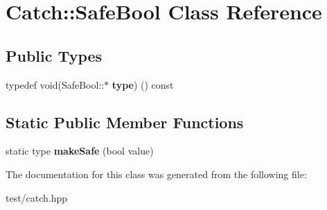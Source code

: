 \hypertarget{classCatch_1_1SafeBool}{}\section{Catch\+:\+:Safe\+Bool Class Reference}
\label{classCatch_1_1SafeBool}
\subsection*{Public Types}
\begin{DoxyCompactItemize}
\item 
typedef void(Safe\+Bool\+::$\ast$ {\bfseries type}) () const \hypertarget{classCatch_1_1SafeBool_a852cdacb020a98edeee0f4da4cf790d5}{}\label{classCatch_1_1SafeBool_a852cdacb020a98edeee0f4da4cf790d5}

\end{DoxyCompactItemize}
\subsection*{Static Public Member Functions}
\begin{DoxyCompactItemize}
\item 
static type {\bfseries make\+Safe} (bool value)\hypertarget{classCatch_1_1SafeBool_af0ea63d9820f8bf7a8b76377913c4e77}{}\label{classCatch_1_1SafeBool_af0ea63d9820f8bf7a8b76377913c4e77}

\end{DoxyCompactItemize}


The documentation for this class was generated from the following file\+:\begin{DoxyCompactItemize}
\item 
test/catch.\+hpp\end{DoxyCompactItemize}
